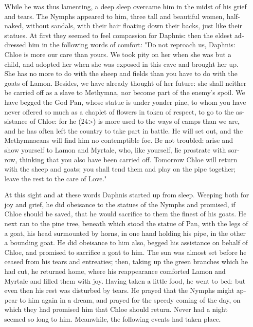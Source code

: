 \documentclass{book}
\begin{document}
\begin{pairs}
\begin{Rightside}
\begin{english}
  While he was thus lamenting, a deep sleep overcame him in the midst of his grief and tears.  The Nymphs appeared to him, three tall and beautiful women, half-naked, without sandals, with their hair floating down their backs, just like their statues.  At first they seemed to feel compassion for Daphnis: then the eldest addressed him in the following words of comfort:  "Do not reproach us, Daphnis: Chloe is more our care than yours.  We took pity on her when she was but a child, and adopted her when she was exposed in this cave and brought her up.  She has no more to do with the sheep and fields than you have to do with the goats of Lamon.  Besides, we have already thought of her future: she shall neither be carried off as a slave to Methymna, nor become part of the enemy's spoil.  We have begged the God Pan, whose statue is under yonder pine, to whom you have never offered so much as a chaplet of flowers in token of respect, to go to the assistance of Chloe: for he (24>) is more used to the ways of camps than we are, and he has often left the country to take part in battle.  He will set out, and the Methymnaeans will find him no contemptible foe.  Be not troubled: arise and show yourself to Lamon and Myrtale, who, like yourself, lie prostrate with sorrow, thinking that you also have been carried off.  Tomorrow Chloe will return with the sheep and goats; you shall tend them and play on the pipe together; leave the rest to the care of Love."
\pend


  At this sight and at these words Daphnis started up from sleep.  Weeping both for joy and grief, he did obeisance to the statues of the Nymphs and promised, if Chloe should be saved, that he would sacrifice to them the finest of his goats.  He next ran to the pine tree, beneath which stood the statue of Pan, with the legs of a goat, his head surmounted by horns, in one hand holding his pipe, in the other a bounding goat.  He did obeisance to him also, begged his assistance on behalf of Chloe, and promised to sacrifice a goat to him.  The sun was almost set before he ceased from his tears and entreaties; then, taking up the green branches which he had cut, he returned home, where his reappearance comforted Lamon and Myrtale and filled them with joy.  Having taken a little food, he went to bed: but even then his rest was disturbed by tears.  He prayed that the Nymphs might appear to him again in a dream, and prayed for the speedy coming of the day, on which they had promised him that Chloe should return.  Never had a night seemed so long to him.  Meanwhile, the following events had taken place.
\pend



\end{english}
\end{Rightside}
\end{pairs}
\end{document}
